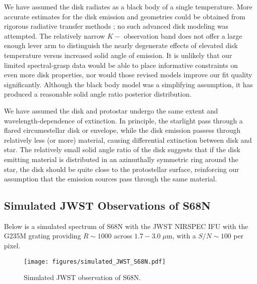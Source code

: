 \documentclass[twocolumn]{emulateapj}%
\begin{document}
We have assumed the disk radiates as a black body of a single temperature.  More accurate estimates for the disk emission and geometries could be obtained from rigorous radiative transfer methods \citep[\emph{e.g.}]{2017arXiv170305765R}; no such advanced disk modeling was attempted.  The relatively narrow $K-$ observation band does not offer a large enough lever arm to distinguish the nearly degenerate effects of elevated disk temperature versus increased solid angle of emission.  It is unlikely that our limited spectral-grasp data would be able to place informative constraints on even more disk properties, nor would those revised models improve our fit quality significantly.  Although the black body model was a simplifying assumption, it has produced a reasonable solid angle ratio posterior distribution.

We have assumed the disk and protostar undergo the same extent and wavelength-dependence of extinction.  In principle, the starlight pass through a flared circumestellar disk or envelope, while the disk emission passess through relatively less (or more) material, causing differential extinction between disk and star.  The relatively small solid angle ratio of the disk suggests that if the disk emitting material is distributed in an azimuthally symmetric ring around the star, the disk should be quite close to the protostellar surface, reinforcing our assumption that the emission sources pass through the same material.


\subsection{Simulated JWST Observations of S68N}

Below is a simulated spectrum of S68N with the JWST NIRSPEC IFU with the G235M grating providing $R\sim1000$ across $1.7-3.0 \; \mu$m, with a $S/N \sim 100$ per pixel.  

\begin{figure}
 \centering
 \texttt{[image: figures/simulated\_JWST\_S68N.pdf]}
 \caption{Simulated JWST observation of S68N.}
 \label{fig:JWST}
\end{figure}


\clearpage
\pagebreak


\appendix
\end{document}
